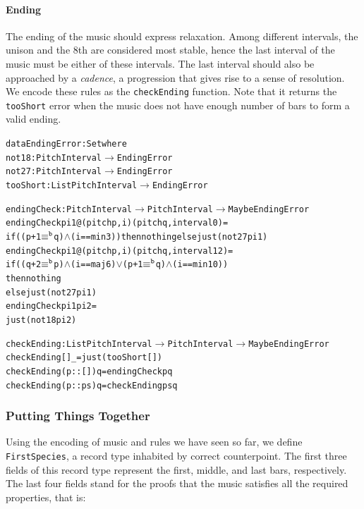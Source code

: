 \paragraph{Ending}

The ending of the music should express relaxation.
Among different intervals, the unison and the 8th are considered
most stable, hence the last interval of the music must be either of
these intervals.
The last interval should also be approached by a \emph{cadence},
a progression that gives rise to a sense of resolution.
We encode these rules as the \texttt{checkEnding} function.
Note that it returns the \texttt{tooShort} error when the music does
not have enough number of bars to form a valid ending.

\begin{alltt}
data EndingError : Set where
  not18    : PitchInterval \(\rightarrow\) EndingError
  not27    : PitchInterval \(\rightarrow\) EndingError
  tooShort : List PitchInterval \(\rightarrow\) EndingError

endingCheck : PitchInterval \(\rightarrow\) PitchInterval \(\rightarrow\) Maybe EndingError
endingCheck pi1@(pitch p , i) (pitch q , interval 0)  = 
  if ((p + 1 \(\equiv\sp{\mathtt{b}}\) q) \(\wedge\) (i == min3)) then nothing else just (not27 pi1)
endingCheck pi1@(pitch p , i) (pitch q , interval 12) =
  if ((q + 2 \(\equiv\sp{\mathtt{b}}\) p) \(\wedge\) (i == maj6) \(\vee\) (p + 1 \(\equiv\sp{\mathtt{b}}\) q) \(\wedge\) (i == min10))
  then nothing
  else just (not27 pi1)
endingCheck pi1               pi2                     =
  just (not18 pi2)

checkEnding : List PitchInterval \(\rightarrow\) PitchInterval \(\rightarrow\) Maybe EndingError
checkEnding []        \_ = just (tooShort [])
checkEnding (p :: []) q = endingCheck p q
checkEnding (p :: ps) q = checkEnding ps q
\end{alltt}

\subsubsection{Putting Things Together}

Using the encoding of music and rules we have seen so far, we define
\texttt{FirstSpecies}, a record type inhabited by correct counterpoint.
The first three fields of this record type represent the first, middle,
and last bars, respectively.
The last four fields stand for the proofs that the music satisfies all
the required properties, that is:

